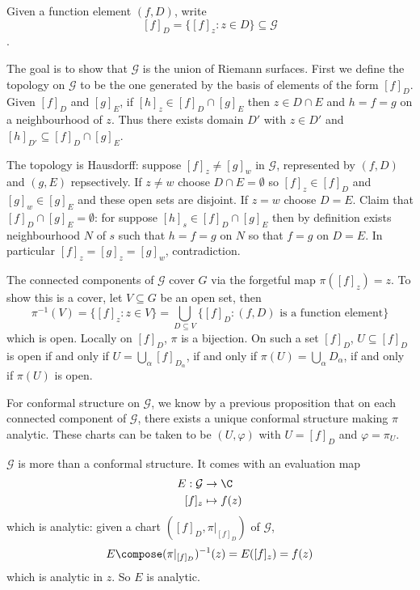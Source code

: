 \documentclass[a4paper]{article}
\begin{document}
\begin{notation}
  Given a function element \((f, D)\), write
  \[
    [f]_D = \{[f]_z: z \in D\} \subseteq \mathcal G
  \].
\end{notation}

The goal is to show that \(\mathcal G\) is the union of Riemann surfaces. First we define the topology on \(\mathcal G\) to be the one generated by the basis of elements of the form \([f]_D\). Given \([f]_D\) and \([g]_E\), if \([h]_z \in [f]_D \cap [g]_E\) then \(z \in D \cap E\) and \(h = f = g\) on a neighbourhood of \(z\). Thus there exists domain \(D'\) with \(z \in D'\) and \([h]_{D'} \subseteq [f]_D \cap [g]_E\).

The topology is Hausdorff: suppose \([f]_z \neq [g]_w\) in \(\mathcal G\), represented by \((f, D)\) and \((g, E)\) repsectively. If \(z \neq w\) choose \(D \cap E = \emptyset\) so \([f]_z \in [f]_D\) and \([g]_w \in [g]_E\) and these open sets are disjoint. If \(z = w\) choose \(D = E\). Claim that \([f]_D \cap [g]_E = \emptyset\): for suppose \([h]_s \in [f]_D \cap [g]_E\) then by definition exists neighbourhood \(N\) of \(s\) such that \(h = f = g\) on \(N\) so that \(f = g\) on \(D = E\). In particular \([f]_z = [g]_z = [g]_w\), contradiction.

The connected components of \(\mathcal G\) cover \(G\) via the forgetful map \(\pi([f]_z) = z\). To show this is a cover, let \(V \subseteq G\) be an open set, then
\[
  \pi^{-1}(V) = \{[f]_z: z \in V\} = \bigcup_{D \subseteq V} \{[f]_D: (f, D) \text{ is a function element}\}
\]
which is open. Locally on \([f]_D\), \(\pi\) is a bijection. On such a set \([f]_D\), \(U \subseteq [f]_D\) is open if and only if \(U = \bigcup_\alpha [f]_{D_\alpha}\), if and only if \(\pi(U) = \bigcup_\alpha D_\alpha\), if and only if \(\pi(U)\) is open.

For conformal structure on \(\mathcal G\), we know by a previous proposition that on each connected component of \(\mathcal G\), there exists a unique conformal structure making \(\pi\) analytic. These charts can be taken to be \((U, \varphi)\) with \(U = [f]_D\) and \(\varphi = \pi_U\).

\(\mathcal G\) is more than a conformal structure. It comes with an evaluation map
\begin{align*}
  E: \mathcal G &\to \C \\
  [f]_z &\mapsto f(z)
\end{align*}
which is analytic: given a chart \(([f]_D, \pi|_{[f]_D})\) of \(\mathcal G\),
\[
  E \compose (\pi|_{[f]_D})^{-1}(z) = E([f]_z) = f(z)
\]
which is analytic in \(z\). So \(E\) is analytic.
\end{document}
